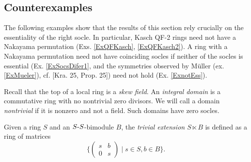 \documentclass[11pt]{article}
\theoremstyle{plain}
\theoremstyle{remark}
\theoremstyle{plain}
\begin{document}
\subsection{Counterexamples}\label{SecDefcounter}

The following examples show that the results of this section rely crucially on the essentiality of the right socle. In particular, Kasch QF-2 rings need not have a Nakayama permutation (Exs. \ref{ExQFKasch}, \ref{ExQFKasch2}). A ring with a Nakayama permutation need not have coinciding socles if neither of the socles is essential (Ex. \ref{ExSocsDifer1}, and the symmetries observed by Müller (ex. \ref{ExMueler}), cf. [Kra. 25, Prop. 25]) need not hold (Ex. \ref{ExnotEss}).

\smallskip 

Recall that the top of a local ring is a \textit{skew field}. An \textit{integral domain} is a commutative ring with no nontrivial zero divisors. We will call a domain  \textit{nontrivial} if it is nonzero and not a field. Such domains have zero socles. 

Given a ring $S$ and an $S\text-S$-bimodule $B$, the \textit{trivial extension $S\ltimes B$} is defined as a ring of matrices  \[\{\begin{pmatrix}s&b\\0&s\end{pmatrix}\mid s\in S, b \in B\}.\] 
\end{document}
